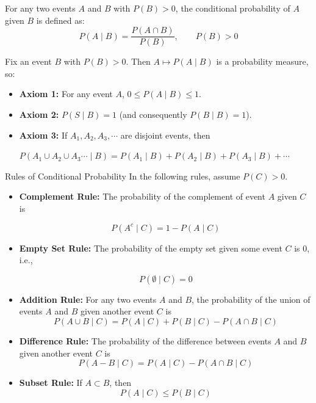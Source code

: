 \begin{definition}
For any two events \( A \) and \( B \) with \( P(B) > 0 \), the conditional probability of \( A \) given \( B \) is defined as:
\[
P(A \mid B) = \frac{P(A \cap B)}{P(B)}, \qquad P(B) > 0
\]
\end{definition}

\begin{axiom}
    Fix an event $B$ with $P(B)>0$. Then $A\mapsto P(A\mid B)$ is a probability measure, so:
    \begin{itemize}
        \item \textbf{Axiom 1:} For any event \(A\), \( 0 \leq P(A\mid B) \leq 1 \).
        \item \textbf{Axiom 2:} $P(S\mid B)=1$ (and consequently $P(B\mid B)=1$).
        \item \textbf{Axiom 3:} If \(A_1, A_2, A_3, \cdots\) are disjoint events, then
         
        \hspace*{2.8em}$P\left(A_1 \cup A_2 \cup A_3 \cdots \mid B\right)=P\left(A_1 \mid B\right)+P\left(A_2 \mid B\right)+P\left(A_3 \mid B\right)+\cdots$
    \end{itemize}
\end{axiom}

\begin{theorem}{Rules of Conditional Probability}
    In the following rules, assume $P(C)>0$.
    \begin{itemize}
        \item \textbf{Complement Rule:} The probability of the complement of event $A$ given $C$ is
    
        \[
        P\left(A^c \mid C\right)=1-P(A \mid C)
        \]

        \item \textbf{Empty Set Rule:} The probability of the empty set given some event $C$ is 0, i.e.,
        
        \[P(\emptyset \mid C) = 0\]
        
        \item \textbf{Addition Rule:} For any two events $A$ and $B$, the probability of the union of events $A$ and $B$ given another event $C$ is
        \[
        P(A \cup B \mid C)=P(A \mid C)+P(B \mid C)-P(A \cap B \mid C)
        \]

        \item \textbf{Difference Rule:} The probability of the difference between events $A$ and $B$ given another event $C$ is
        \[
            P(A-B \mid C)=P(A \mid C)-P(A \cap B \mid C)
        \]
        \item \textbf{Subset Rule:} If $A \subset B$, then
        \[
        P(A \mid C) \leq P(B \mid C)
        \]
    \end{itemize}
\end{theorem}

